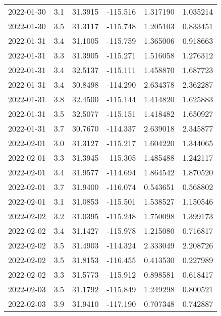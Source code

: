 \begin{tabular}{lrrrrr}
2022-01-30 &       3.1 &  31.3915 &  -115.516 &         1.317190 &         1.035214 \\
2022-01-30 &       3.5 &  31.3117 &  -115.748 &         1.205103 &         0.833451 \\
2022-01-31 &       3.4 &  31.1005 &  -115.759 &         1.365006 &         0.918663 \\
2022-01-31 &       3.3 &  31.3905 &  -115.271 &         1.516058 &         1.276312 \\
2022-01-31 &       3.4 &  32.5137 &  -115.111 &         1.458870 &         1.687723 \\
2022-01-31 &       3.4 &  30.8498 &  -114.290 &         2.634378 &         2.362287 \\
2022-01-31 &       3.8 &  32.4500 &  -115.144 &         1.414820 &         1.625883 \\
2022-01-31 &       3.5 &  32.5077 &  -115.151 &         1.418482 &         1.650927 \\
2022-01-31 &       3.7 &  30.7670 &  -114.337 &         2.639018 &         2.345877 \\
2022-02-01 &       3.0 &  31.3127 &  -115.217 &         1.604220 &         1.344065 \\
2022-02-01 &       3.3 &  31.3945 &  -115.305 &         1.485488 &         1.242117 \\
2022-02-01 &       3.4 &  31.9577 &  -114.694 &         1.864542 &         1.870520 \\
2022-02-01 &       3.7 &  31.9400 &  -116.074 &         0.543651 &         0.568802 \\
2022-02-01 &       3.1 &  31.0853 &  -115.501 &         1.538527 &         1.150546 \\
2022-02-02 &       3.2 &  31.0395 &  -115.248 &         1.750098 &         1.399173 \\
2022-02-02 &       3.4 &  31.1427 &  -115.978 &         1.215080 &         0.716817 \\
2022-02-02 &       3.5 &  31.4903 &  -114.324 &         2.333049 &         2.208726 \\
2022-02-02 &       3.5 &  31.8153 &  -116.455 &         0.413530 &         0.227989 \\
2022-02-02 &       3.3 &  31.5773 &  -115.912 &         0.898581 &         0.618417 \\
2022-02-03 &       3.5 &  31.1792 &  -115.849 &         1.249298 &         0.800521 \\
2022-02-03 &       3.9 &  31.9410 &  -117.190 &         0.707348 &         0.742887 \\

\end{tabular}
